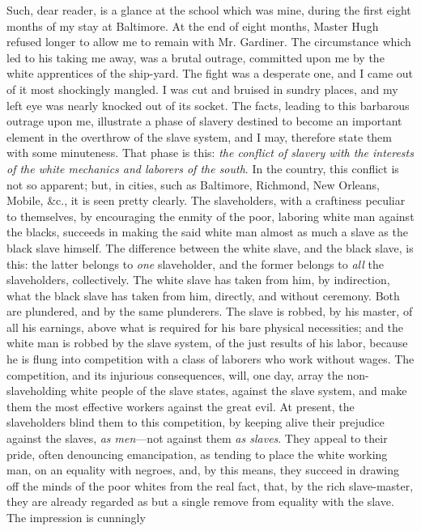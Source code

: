 Such, dear reader, is a glance at the school which was mine, during the
first eight months of my stay at Baltimore. At the end of eight months,
Master Hugh refused longer to allow me to remain with Mr. Gardiner. The
circumstance which led to his taking me away, was a brutal outrage,
committed upon me by the white apprentices of the ship-yard. The fight
was a desperate one, and I came out of it most shockingly mangled. I was
cut and bruised in sundry places, and my left eye was nearly knocked out
of its socket. The facts, leading to this barbarous outrage upon me,
illustrate a phase of slavery destined to become an important element in
the overthrow of the slave system, and I may, therefore state them with
some minuteness. That phase is this: \emph{the conflict of slavery with
the interests of the white mechanics and laborers of the south}. In the
country, this conflict is not so apparent; but, in cities, such as
Baltimore, Richmond, New Orleans, Mobile, \&c., it is seen pretty
clearly. The slaveholders, with a craftiness peculiar {}to themselves,
by encouraging the enmity of the poor, laboring white man against the
blacks, succeeds in making the said white man almost as much a slave as
the black slave himself. The difference between the white slave, and the
black slave, is this: the latter belongs to \emph{one} slaveholder, and
the former belongs to \emph{all} the slaveholders, collectively. The
white slave has taken from him, by indirection, what the black slave has
taken from him, directly, and without ceremony. Both are plundered, and
by the same plunderers. The slave is robbed, by his master, of all his
earnings, above what is required for his bare physical necessities; and
the white man is robbed by the slave system, of the just results of his
labor, because he is flung into competition with a class of laborers who
work without wages. The competition, and its injurious consequences,
will, one day, array the non-slaveholding white people of the slave
states, against the slave system, and make them the most effective
workers against the great evil. At present, the slaveholders blind them
to this competition, by keeping alive their prejudice against the
slaves, \emph{as men}---not against them \emph{as slaves}. They appeal
to their pride, often denouncing emancipation, as tending to place the
white working man, on an equality with negroes, and, by this means, they
succeed in drawing off the minds of the poor whites from the real fact,
that, by the rich slave-master, they are already regarded as but a
single remove from equality with the slave. The impression is cunningly
